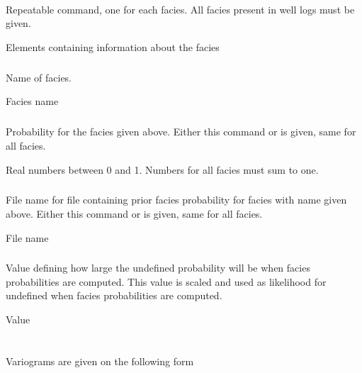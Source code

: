 \paragraph{}
 \slist
   \item \Description Repeatable command, one for each facies. All facies present in well logs must be given.
   \item \Argument Elements containing information about the facies
   \item \Default
 \elist

\subparagraph{}
 \slist
   \item \Description Name of facies.
   \item \Argument Facies name
   \item \Default
 \elist

\subparagraph{}
 \slist
   \item \Description Probability for the facies given above. Either this command or  is given, same for all facies.
   \item \Argument Real numbers between 0 and 1. Numbers for all facies must sum to one.
   \item \Default
 \elist

\subparagraph{}
 \slist
   \item \Description File name for file containing prior facies probability for facies with name given above. Either this command or  is given, same for all facies.
   \item \Argument File name
   \item \Default
 \elist


\subsubsection{}
 \slist
   \item \Description Value defining how large the undefined probability will be when facies probabilities are computed. This value is scaled and used as likelihood for undefined when facies probabilities are computed.
   \item \Argument Value
   \item {}
 \elist

\section{}
 \slist
   \item \Description Variograms are given on the following form
   \item \Argument
   \item \Default
 \elist

